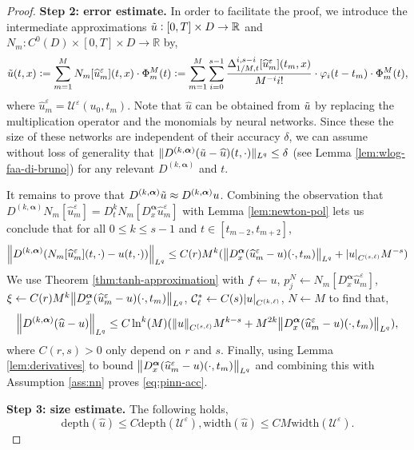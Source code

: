 \documentclass{article}
\numberwithin{equation}{section}
\newcommand{\width}{\mathrm{width}}
\newcommand{\depth}{\mathrm{depth}}
\newcommand{\R}{\mathbb{R}}
\newcommand{\cC}{\mathcal{C}}
\newcommand{\cU}{\mathcal{U}}
\newcommand{\bmalpha}{{\bm{\alpha}}}
\newcommand{\uhat}{{\widehat{u}}}
\renewcommand{\epsilon}{\varepsilon}
\newcommand{\1}{\mathbbm{1}}
\newcommand{\utilde}{\Tilde{u}}
\begin{document}
\begin{proof}
\textbf{Step 2: error estimate.} In order to facilitate the proof, we introduce the intermediate approximations $\utilde:[0,T]\times D\to \R$ and $N_m:C^0(D)\times [0,T]\times D\to \R$ by, 
\begin{equation}
     \utilde(t,x) := \sum_{m=1}^M N_m[\uhat^\epsilon_m](t,x)\cdot \Phi^M_m(t) := \sum_{m=1}^M \sum_{i=0}^{s-1} \frac{\Delta^{i,s-i}_{1/M,t}[\uhat^\epsilon_m](t_m,x)}{M^{-i} i!}\cdot \varphi_i(t-t_m)\cdot \Phi^M_m(t), 
\end{equation}
where $\uhat^\epsilon_m = \cU^\epsilon(u_0,t_m)$. Note that $\uhat$ can be obtained from $\utilde$ by replacing the multiplication operator and the monomials by neural networks. Since these the size of these networks are independent of their accuracy $\delta$, we can assume without loss of generality that $\Vert D^{(k,\bmalpha)}(\utilde-\uhat)(t,\cdot)\Vert_{L^q}\leq \delta$ (see Lemma \ref{lem:wlog-faa-di-bruno}) for any relevant $D^{(k,\bmalpha)}$ and $t$. 

It remains to prove that $D^{(k,\bmalpha)}\utilde \approx D^{(k,\bmalpha)}u$. 
Combining the observation that $D^{(k,\bmalpha)}N_m[\uhat^\epsilon_m] = D_t^k N_m[D^\bmalpha_x\uhat^\epsilon_m]$ with Lemma \ref{lem:newton-pol} lets us conclude that for all $0\leq k\leq s-1$ and $t\in[t_{m-2}, t_{m+2}]$,
\begin{equation}
    \norm{D^{(k,\bmalpha)}( N_m[\uhat^\epsilon_m](t,\cdot)-u(t,\cdot))}_{L^q} \leq C(r)M^k(\norm{D^\bmalpha_x(\uhat^\epsilon_m-u)(\cdot,t_m)}_{L^q}+\abs{u}_{C^{(s,\ell)}}M^{-s})
\end{equation}
We use Theorem \ref{thm:tanh-approximation} with $f\leftarrow u$, $p_j^N \leftarrow  N_m[D^\bmalpha_x\uhat^\epsilon_m]$, $\xi\leftarrow C(r)M^{k} \norm{D^\bmalpha_x(\uhat^\epsilon_m-u)(\cdot,t_m)}_{L^q}$, $\cC^*_\ell \leftarrow C(s)\abs{u}_{C^{(k,\ell)}}$, $N\leftarrow M$ to find that, 
\begin{equation}
    \norm{D^{(k,\bmalpha)}(\uhat-u)}_{L^q} \leq C\ln^k(M)(\norm{u}_{C^{(s,\ell)}}M^{k-s}+M^{2k}\norm{D^\bmalpha_x(\uhat^\epsilon_m-u)(\cdot,t_m)}_{L^q}), 
\end{equation}
where $C(r,s)>0$ only depend on $r$ and $s$. Finally, using Lemma \ref{lem:derivatives} to bound $\norm{D^\bmalpha_x(\uhat^\epsilon_m-u)(\cdot,t_m)}_{L^q}$ and combining this with  Assumption \ref{ass:nn} proves \eqref{eq:pinn-acc}. 

\textbf{Step 3: size estimate.} The following holds, 
\begin{equation}
    \depth(\uhat)\leq C\depth(\cU^\epsilon), \width(\uhat) \leq CM \width(\cU^\epsilon). 
\end{equation}
\end{proof}
\end{document}
